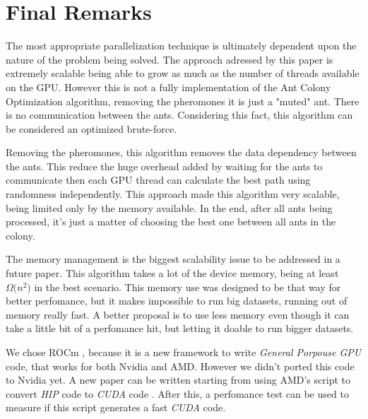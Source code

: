 \section{Final Remarks}

The most appropriate parallelization technique is ultimately dependent upon the
nature of the problem being solved. The approach adressed by this paper
is extremely scalable being able to grow as much as the number of threads available on the GPU.
However this is not a fully implementation of the Ant Colony Optimization algorithm,
removing the pheromones it is just a "muted" ant. There is no communication between the ants.
Considering this fact, this algorithm can be considered an optimized brute-force.

Removing the pheromones, this algorithm removes the data dependency between the ants.
This reduce the huge overhead added by waiting for the ants to communicate then each GPU
thread can calculate the best path using randomness independently. This approach made this algorithm
very scalable, being limited only by the memory available. In the end, after all ants
being processed, it's just a matter of choosing the best one between all ants in the colony.

The memory management is the biggest scalability issue to be addressed in a future paper. This algorithm
takes a lot of the device memory, being at least $\Omega({n^{2})}$ in the best scenario.
This memory use was designed to be that way for better perfomance, but it makes impossible to run big datasets, running out
of memory really fast. A better proposal is to use less memory even though it can take a little bit of a perfomance hit, but
letting it doable to run bigger datasets.

We chose ROCm \cite{rocm}, because it is a new framework to write \emph{General Porpouse GPU} code, that
works for both Nvidia and AMD. However we didn't ported this code to Nvidia yet. A new paper can be
written starting from using AMD's script to convert \emph{HIP} code to \emph{CUDA}
code \cite{hipifyamd}. After this, a perfomance test can be used to measure if this script
generates a fast \emph{CUDA} code.
